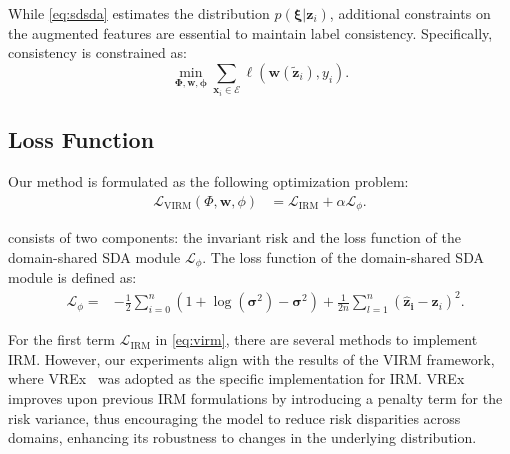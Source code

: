 While \cref{eq:sdsda} estimates the distribution $p(\mathbf{\xi}|\mathbf{\mathbf{z}}_i)$, additional constraints on the augmented features are essential to maintain label consistency. Specifically, consistency is constrained as:
\begin{equation}
	\label{eq:label_consistency}
	\min_{\mathbf{\Phi, \mathbf{w}}, \mathbf{\phi}} \sum_{\mathbf{x}_i \in \mathcal{E}}  \ell (\mathbf{w}(\tilde{\mathbf{z}}_i), y_i).
\end{equation}

\subsection{Loss Function}
\label{sec:loss}
Our method is formulated as the following optimization problem:
\begin{equation}
	\label{eq:virm}
	\begin{aligned}
		\mathcal{L}_{\text{VIRM}}(\Phi, \mathbf{w}, \phi) 
		& = \mathcal{L}_{\text{IRM}} + \alpha \mathcal{L}_{\phi}.
	\end{aligned}
\end{equation}

 consists of two components: the invariant risk and the loss function of the domain-shared SDA module $\mathcal{L}_{\phi}$. The loss function of the domain-shared SDA module is defined as:
\begin{equation}
	\begin{aligned}
	& \mathcal{L}_{\phi} = 
	& - \frac{1}{2}\sum_{i=0}^n(1 + \log(\boldsymbol{\sigma}^2) - \boldsymbol{\sigma}^2 ) + 
	\frac{1}{2n}\sum_{l=1}^n (\mathbf{\hat{z}_i} - \mathbf{z}_i)^2.
  \label{eq:loss_dssda}
  \end{aligned}
\end{equation}

For the first term $\mathcal{L}_{\text{IRM}}$ in \cref{eq:virm}, there are several methods to implement IRM. However, our experiments align with the results of the VIRM framework, where VREx~\cite{krueger2021out} was adopted as the specific implementation for IRM. VREx improves upon previous IRM formulations by introducing a penalty term for the risk variance, thus encouraging the model to reduce risk disparities across domains, enhancing its robustness to changes in the underlying distribution.
